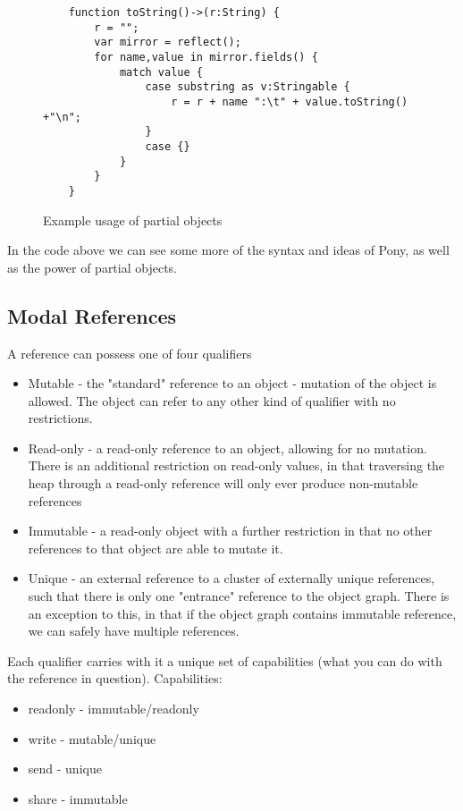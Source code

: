 \documentclass{article}
\begin{document}
\begin{figure}[H]
\begin{verbatim}
    function toString()->(r:String) {
        r = "";
        var mirror = reflect();
        for name,value in mirror.fields() {
            match value {
                case substring as v:Stringable {
                    r = r + name ":\t" + value.toString() +"\n";
                }
                case {}
            }
        }
    }
\end{verbatim}
\caption{Example usage of partial objects}
\label{fig:partialobj}
\end{figure}

In the code above we can see some more of the syntax and ideas of Pony, as well as the power of partial objects.

\subsection{Modal References}
\label{sec:immutability}

A reference can possess one of four qualifiers\cite{microsoft2012}

\begin{itemize}
	\item Mutable - the "standard" reference to an object - mutation of the object is allowed. 
		The object can refer to any other kind of qualifier with no restrictions.
	\item Read-only - a read-only reference to an object, allowing for no mutation.
		There is an additional restriction on read-only values, in that traversing the heap through a read-only reference will only ever produce non-mutable references
	\item Immutable - a read-only object with a further restriction in that no other references to that object are able to mutate it.
	\item Unique - an external reference to a cluster of externally unique references, such that there is only one "entrance" reference to the object graph.
		There is an exception to this, in that if the object graph contains immutable reference, we can safely have multiple references.
\end{itemize}

Each qualifier carries with it a unique set of capabilities (what you can do with the reference in question).
Capabilities:
\begin{itemize}[noitemsep]
	\item readonly - immutable/readonly
	\item write - mutable/unique
	\item send - unique
	\item share - immutable
\end{itemize}
\end{document}
